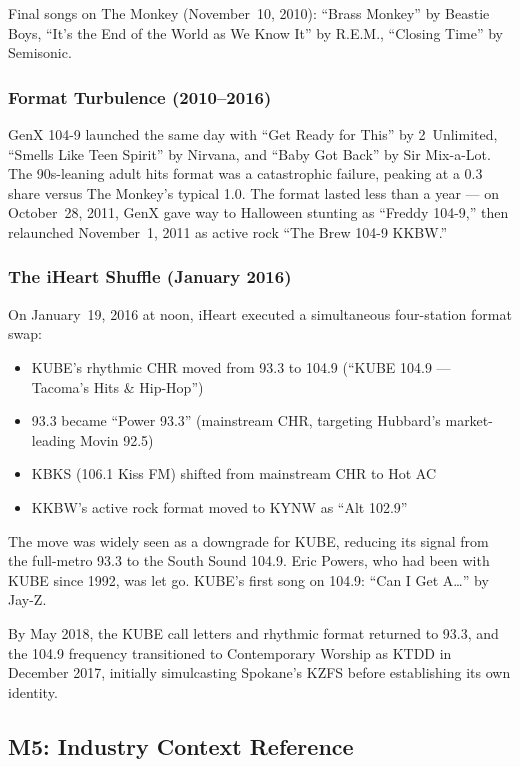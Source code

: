 \documentclass[11pt,letterpaper]{article}
\begin{document}
Final songs on The Monkey (November~10, 2010): ``Brass Monkey'' by Beastie Boys, ``It's the End of the World as We Know It'' by R.E.M., ``Closing Time'' by Semisonic.

\subsubsection{Format Turbulence (2010--2016)}

GenX 104-9 launched the same day with ``Get Ready for This'' by 2~Unlimited, ``Smells Like Teen Spirit'' by Nirvana, and ``Baby Got Back'' by Sir Mix-a-Lot. The 90s-leaning adult hits format was a catastrophic failure, peaking at a 0.3 share versus The Monkey's typical 1.0. The format lasted less than a year --- on October~28, 2011, GenX gave way to Halloween stunting as ``Freddy 104-9,'' then relaunched November~1, 2011 as active rock ``The Brew 104-9 KKBW.''

\subsubsection{The iHeart Shuffle (January 2016)}

On January~19, 2016 at noon, iHeart executed a simultaneous four-station format swap:

\begin{itemize}[leftmargin=2em]
\item KUBE's rhythmic CHR moved from 93.3 to 104.9 (``KUBE 104.9 --- Tacoma's Hits \& Hip-Hop'')
\item 93.3 became ``Power 93.3'' (mainstream CHR, targeting Hubbard's market-leading Movin 92.5)
\item KBKS (106.1 Kiss FM) shifted from mainstream CHR to Hot AC
\item KKBW's active rock format moved to KYNW as ``Alt 102.9''
\end{itemize}

The move was widely seen as a downgrade for KUBE, reducing its signal from the full-metro 93.3 to the South Sound 104.9. Eric Powers, who had been with KUBE since 1992, was let go. KUBE's first song on 104.9: ``Can I Get A\ldots'' by Jay-Z.

By May 2018, the KUBE call letters and rhythmic format returned to 93.3, and the 104.9 frequency transitioned to Contemporary Worship as KTDD in December 2017, initially simulcasting Spokane's KZFS before establishing its own identity.

\subsection{M5: Industry Context Reference}
\end{document}
